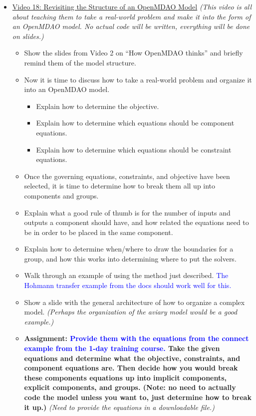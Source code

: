 \documentclass[12pt, letterpaper]{article}
\begin{document}
\begin{itemize}
	\item \underline{Video 18: Revisiting the Structure of an OpenMDAO Model} \textit{(This video is all about teaching them to take a real-world problem and make it into the form of an OpenMDAO model. No actual code will be written, everything will be done on slides.)}
		\begin{itemize}
			\item Show the slides from Video 2 on “How OpenMDAO thinks” and briefly remind them of the model structure.
			\item Now it is time to discuss how to take a real-world problem and organize it into an OpenMDAO model.
				\begin{itemize}
					\item Explain how to determine the objective.
					\item Explain how to determine which equations should be component equations.
					\item Explain how to determine which equations should be constraint equations.
				\end{itemize}
			\item Once the governing equations, constraints, and objective have been selected, it is time to determine how to break them all up into components and groups.
			\item Explain what a good rule of thumb is for the number of inputs and outputs a component should have, and how related the equations need to be in order to be placed in the same component.
			\item Explain how to determine when/where to draw the boundaries for a group, and how this works into determining where to put the solvers.
			\item Walk through an example of using the method just described. \textcolor{blue}{The Hohmann transfer example from the docs should work well for this.}
			\item Show a slide with the general architecture of how to organize a complex model. \textit{(Perhaps the organization of the aviary model would be a good example.)}
			\item \textbf{Assignment: \textcolor{blue}{Provide them with the equations from the connect example from the 1-day training course.} Take the given equations and determine what the objective, constraints, and component equations are. Then decide how you would break these components equations up into implicit components, explicit components, and groups. (Note: no need to actually code the model unless you want to, just determine how to break it up.)} \textit{(Need to provide the equations in a downloadable file.)}
		\end{itemize}	
		

\end{itemize}
\end{document}
